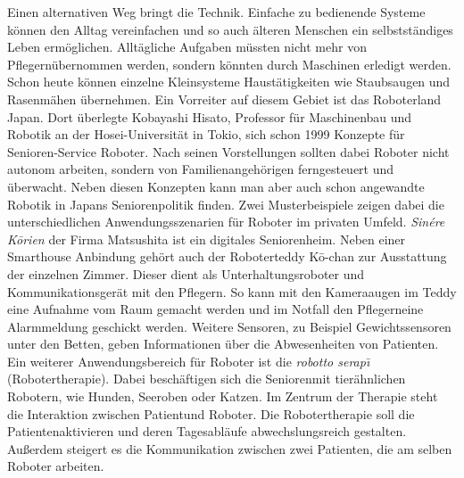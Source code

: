 Einen alternativen Weg bringt die Technik. Einfache zu bedienende Systeme können den Alltag vereinfachen und so auch älteren Menschen ein selbstständiges Leben ermöglichen. Alltägliche Aufgaben müssten nicht mehr von Pflegern\FemaleMale übernommen werden, sondern könnten durch Maschinen erledigt werden. Schon heute können einzelne Kleinsysteme Haustätigkeiten wie Staubsaugen und Rasenmähen übernehmen. Ein Vorreiter auf diesem Gebiet ist das Roboterland Japan. Dort überlegte Kobayashi Hisato, Professor für Maschinenbau und Robotik an der Hosei-Universität in Tokio, sich schon 1999 Konzepte für Senioren-Service Roboter.\citep{wagner2009tele}  Nach seinen Vorstellungen sollten dabei Roboter nicht autonom arbeiten, sondern von Familienangehörigen ferngesteuert und überwacht.\citep{kobayashihisato1999} Neben diesen Konzepten kann man aber auch schon angewandte Robotik in Japans Seniorenpolitik finden. Zwei Musterbeispiele zeigen dabei die unterschiedlichen Anwendungsszenarien für Roboter im privaten Umfeld. \textit{Sinére K\={o}rien} der Firma Matsushita ist ein digitales Seniorenheim. Neben einer Smarthouse Anbindung gehört auch der Roboterteddy K\={o}-chan zur Ausstattung der einzelnen Zimmer. Dieser dient als Unterhaltungsroboter und Kommunikationsgerät mit den Pflegern\FemaleMale. So kann mit den Kameraaugen im Teddy eine Aufnahme vom Raum gemacht werden und im Notfall den Pflegern\FemaleMale eine Alarmmeldung geschickt werden. Weitere Sensoren, zu  Beispiel Gewichtssensoren unter den Betten, geben Informationen über die Abwesenheiten von Patienten\FemaleMale.\citep{wagner2009tele} Ein weiterer Anwendungsbereich für Roboter ist die \textit{robotto serap\={\i}} (Robotertherapie). Dabei beschäftigen sich die Senioren\FemaleMale mit tierähnlichen Robotern, wie Hunden, Seeroben oder Katzen. Im Zentrum der Therapie steht die Interaktion zwischen Patient\FemaleMale und Roboter. Die Robotertherapie soll die Patienten\FemaleMale aktivieren und deren Tagesabläufe abwechslungsreich gestalten. Außerdem steigert es die Kommunikation zwischen zwei Patienten\FemaleMale, die am selben Roboter arbeiten. \citep{wagner2009tele}

